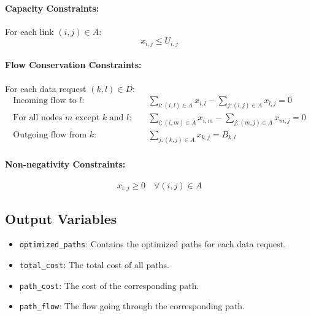\documentclass{article}
\begin{document}
\paragraph{Capacity Constraints:}
For each link \( (i,j) \in A \):
\[
x_{i,j} \leq U_{i,j}
\]

\paragraph{Flow Conservation Constraints:}
For each data request \( (k,l) \in D \):
\begin{align*}
    \text{Incoming flow to } l: & \quad \sum_{i: (i,l) \in A} x_{i,l} - \sum_{j: (l,j) \in A} x_{l,j} = 0 \\
    \text{For all nodes } m \text{ except } k \text{ and } l: & \quad \sum_{i: (i,m) \in A} x_{i,m} - \sum_{j: (m,j) \in A} x_{m,j} = 0 \\
    \text{Outgoing flow from } k: & \quad \sum_{j: (k,j) \in A} x_{k,j} = B_{k,l}
\end{align*}

\paragraph{Non-negativity Constraints:}
\[
x_{i,j} \geq 0 \quad \forall (i,j) \in A
\]

\subsection*{Output Variables}
\begin{itemize}
    \item \texttt{optimized\_paths}: Contains the optimized paths for each data request.
    \item \texttt{total\_cost}: The total cost of all paths.
    \item \texttt{path\_cost}: The cost of the corresponding path.
    \item \texttt{path\_flow}: The flow going through the corresponding path.
\end{itemize}
\end{document}
